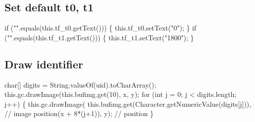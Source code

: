 \subsection{Set default t0, t1}
\nwenddocs{}\endmoddef{}
if ("".equals(this.tf_t0.getText())) \{
  this.tf_t0.setText("0");
\}
if ("".equals(this.tf_t1.getText())) \{
  this.tf_t1.setText("1800");
\}
\nwendcode{}\nwdocspar

\subsection{Draw identifier}
\nwenddocs{}\endmoddef{}
char[] digits = String.valueOf(uid).toCharArray();
this.gc.drawImage(this.bufimg.get(10), x, y);
for (int j = 0; j < digits.length; j++) \{
  this.gc.drawImage(
    this.bufimg.get(Character.getNumericValue(digits[j])),  // image
      position(x + 8*(j+1)), y);  // position
\}
\nwendcode{}\nwdocspar

